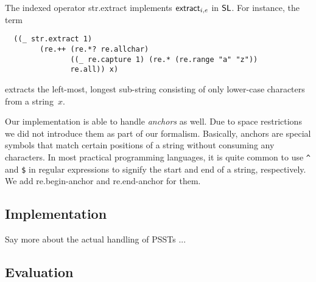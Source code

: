 The indexed operator {\sf str.extract} implements $\mathsf{extract}_{i, e}$ in
$\mathsf{SL}$. For instance, the term
%
\begin{verbatim}
  ((_ str.extract 1)
        (re.++ (re.*? re.allchar)
               ((_ re.capture 1) (re.* (re.range "a" "z"))
               re.all)) x)
\end{verbatim}
%
extracts the left-most, longest sub-string consisting of only lower-case
characters from a string~$x$.

Our implementation is able to handle \textit{anchors} as well. Due to space restrictions we did not introduce them as part of our formalism. Basically, anchors are special symbols that match certain positions of a string without consuming any characters. In most practical programming languages, it is quite common to use \verb!^! and \verb!$! in regular expressions to signify the start and end of a string, respectively. We add \textsf{re.begin-anchor} and \textsf{re.end-anchor} for them.

\subsection{Implementation}

Say more about the actual handling of PSSTs ...

\subsection{Evaluation}

